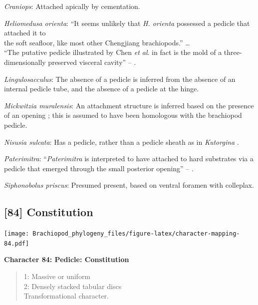 \documentclass[openany]{book}
\theoremstyle{definition}
\theoremstyle{definition}
\theoremstyle{definition}
\theoremstyle{remark}
\begin{document}
\hypertarget{Craniops-coding-83}{}
\emph{Craniops}: Attached apically by cementation.

\hypertarget{Heliomedusa_orienta-coding-83}{}
\emph{Heliomedusa orienta}: ``It seems unlikely that \emph{H. orienta}
possessed a pedicle that attached it to\\
the soft seafloor, like most other Chengjiang brachiopods.'' \ldots{}\\
``The putative pedicle illustrated by Chen \emph{et al}.
\citeyearpar[Figs 4, 6, 7]{Chen2007Reinterpretationof} in fact is the
mold of a three-dimensionally preserved visceral cavity'' --
\citet{Zhang2009Architectureand}.

\hypertarget{Lingulosacculus-coding-83}{}
\emph{Lingulosacculus}: The absence of a pedicle is inferred from the
absence of an internal pedicle tube, and the absence of a pedicle at the
hinge.

\hypertarget{Mickwitzia_muralensis-coding-83}{}
\emph{Mickwitzia muralensis}: An attachment structure is inferred based
on the presence of an opening \citep{Balthasar2004Shellstructure}; this
is assumed to have been homologous with the brachiopod pedicle.

\hypertarget{Nisusia_sulcata-coding-83}{}
\emph{Nisusia sulcata}: Has a pedicle, rather than a pedicle sheath as
in \emph{Kutorgina}
\citep{Holmer2018Evolutionarysignificance, Holmer2018Theattachment}.

\hypertarget{Paterimitra-coding-83}{}
\emph{Paterimitra}: ``\emph{Paterimitra} is interpreted to have attached
to hard substrates via a pedicle that emerged through the small
posterior opening'' -- \citet{Skovsted2009Thescleritome}.

\hypertarget{Siphonobolus_priscus-coding-83}{}
\emph{Siphonobolus priscus}: Presumed present, based on ventral foramen
with colleplax.

\subsection*{{[}84{]} Constitution}\label{constitution}

\texttt{[image: Brachiopod\_phylogeny\_files/figure-latex/character-mapping-84.pdf]}

\textbf{Character 84: Pedicle: Constitution}

\begin{quote}
1: Massive or uniform\\
2: Densely stacked tabular discs\\
Transformational character.
\end{quote}
\end{document}
